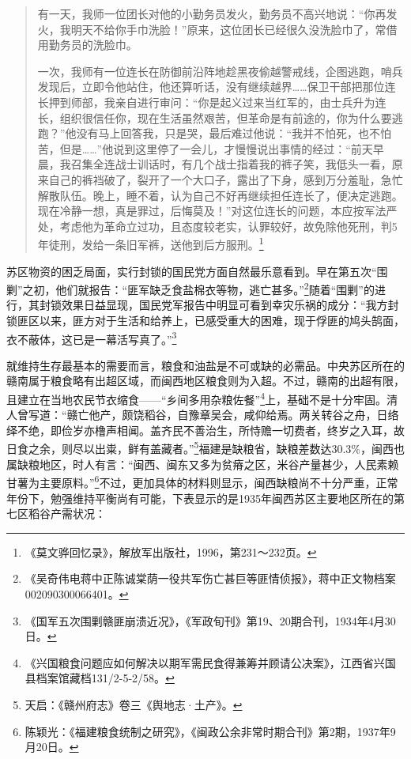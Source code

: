 \begin{quote}

有一天，我师一位团长对他的小勤务员发火，勤务员不高兴地说：“你再发火，我明天不给你手巾洗脸！”原来，这位团长已经很久没洗脸巾了，常借用勤务员的洗脸巾。

一次，我师有一位连长在防御前沿阵地趁黑夜偷越警戒线，企图逃跑，哨兵发现后，立即令他站住，他还算听话，没有继续越界……保卫干部把那位连长押到师部，我亲自进行审问：“你是起义过来当红军的，由士兵升为连长，组织很信任你，现在生活虽然艰苦，但革命是有前途的，你为什么要逃跑？”他没有马上回答我，只是哭，最后难过他说：“我并不怕死，也不怕苦，但是……”他说到这里停了一会儿，才慢慢说出事情的经过：“前天早晨，我召集全连战士训话时，有几个战士指着我的裤子笑，我低头一看，原来自己的裤裆破了，裂开了一个大口子，露出了下身，感到万分羞耻，急忙解散队伍。晚上，睡不着，认为自己不好再继续担任连长了，便决定逃跑。现在冷静一想，真是罪过，后悔莫及！”对这位连长的问题，本应按军法严处，考虑他为革命立过功，且态度较老实，认罪较好，故免除他死刑，判5年徒刑，发给一条旧军裤，送他到后方服刑。\footnote{《莫文骅回忆录》，解放军出版社，1996，第231～232页。}
\end{quote}


苏区物资的困乏局面，实行封锁的国民党方面自然最乐意看到。早在第五次“围剿”之初，他们就报告：“匪军缺乏食盐棉衣等物，逃亡甚多。”\footnote{《吴奇伟电蒋中正陈诚棠荫一役共军伤亡甚巨等匪情侦报》，蒋中正文物档案002090300066401。}随着“围剿”的进行，其封锁效果日益显现，国民党军报告中明显可看到幸灾乐祸的成分：“我方封锁匪区以来，匪方对于生活和给养上，已感受重大的困难，现于俘匪的鸠头鹄面，衣不蔽体，这已是一幕活写真了。”\footnote{《国军五次围剿赣匪崩溃近况》，《军政旬刊》第19、20期合刊，1934年4月30日。}


就维持生存最基本的需要而言，粮食和油盐是不可或缺的必需品。中央苏区所在的赣南属于粮食略有出超区域，而闽西地区粮食则为入超。不过，赣南的出超有限，且建立在当地农民节衣缩食——“乡间多用杂粮佐餐”\footnote{《兴国粮食问题应如何解决以期军需民食得兼筹并顾请公决案》，江西省兴国县档案馆藏档131/2-5-2/58。}上，基础不是十分牢固。清人曾写道：“赣亡他产，颇饶稻谷，自豫章吴会，咸仰给焉。两关转谷之舟，日络绎不绝，即俭岁亦橹声相闻。盖齐民不善治生，所恃赡一切费者，终岁之入耳，故日食之余，则尽以出粜，鲜有盖藏者。”\footnote{天启：《赣州府志》卷三《舆地志·土产》。}福建是缺粮省，缺粮差数达30.3\%，闽西也属缺粮地区，时人有言：“闽西、闽东又多为贫瘠之区，米谷产量甚少，人民素赖甘薯为主要原料。”\footnote{陈颖光：《福建粮食统制之研究》，《闽政公余非常时期合刊》第2期，1937年9月20日。}不过，更加具体的材料则显示，闽西缺粮尚不十分严重，正常年份下，勉强维持平衡尚有可能，下表显示的是1935年闽西苏区主要地区所在的第七区稻谷产需状况：

